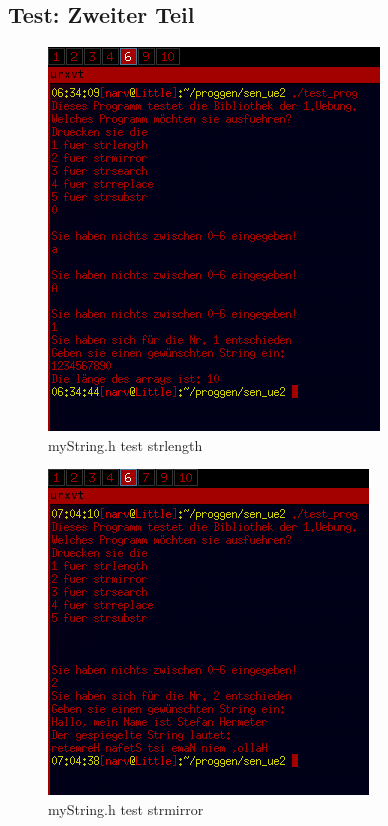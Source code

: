 \documentclass{scrartcl}
\begin{document}
\subsection{Test: Zweiter Teil}
\begin{figure}[H]
  \centering
  \includegraphics[width=0.9\linewidth]{images/test_prog1.png}
  \caption{myString.h test strlength}
  \label{fig:digraph}
\end{figure}

\begin{figure}[H]
  \centering
  \includegraphics[width=0.9\linewidth]{images/test_prog2.png}
  \caption{myString.h test strmirror}
  \label{fig:digraph}
\end{figure}
\end{document}
